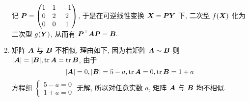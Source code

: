 \begin{solution}
\begin{enumerate}[label=(\arabic{*})]
              记 $\vb*{P}=\begin{pmatrix} 1 & 1 & -1 \\ 0 & 2 & 2 \\ 0 & 0 & 1 \\\end{pmatrix}$, 于是在可逆线性变换 $\vb*{X}=\vb*{PY}$ 下, 二次型 $f(\vb*{X})$ 化为二次型 $g(\vb*{Y})$, 从而有 $\vb*{P}^\top\vb*{AP}=\vb*{B}.$
        \item 矩阵 $\vb*{A}$ 与 $\vb*{B}$ 不相似, 理由如下, 因为若矩阵 $\vb*{A} \sim \vb*{B}$ 则 $|\vb*{A}|=|\vb*{B}|,\tr\vb*{A}=\tr\vb*{B}$, 由于
              $$
                  |\vb*{A}|=0,|\vb*{B}|=5-a,\tr\vb*{A}=0,\tr\vb*{B}=1+a
              $$
              方程组 $\begin{cases}
                      5-a=0 \\ 1+a=0
                  \end{cases}$ 无解, 所以对任意实数 $a$, 矩阵 $\vb*{A}$ 与 $\vb*{B}$ 均不相似.
    \end{enumerate}
\end{solution}